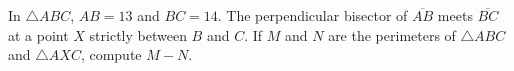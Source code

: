 In $\triangle ABC$, $AB=13$ and $BC=14$. The perpendicular bisector of $\overline{AB}$ meets $\overline{BC}$ at a point $X$ strictly between $B$ and $C$. If $M$ and $N$ are the perimeters of $\triangle ABC$ and $\triangle AXC$, compute $M-N$.
